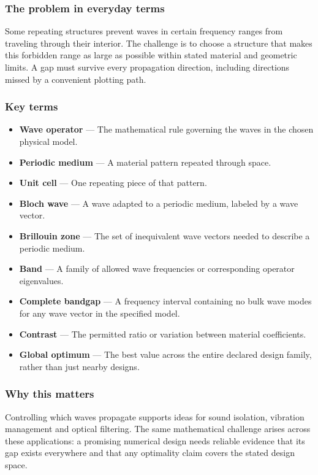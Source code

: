\documentclass[
  11pt,
]{article}
\begin{document}
\subsubsection{The problem in everyday terms}

Some repeating structures prevent waves in certain frequency ranges from
traveling through their interior. The challenge is to choose a structure
that makes this forbidden range as large as possible within stated
material and geometric limits. A gap must survive every propagation
direction, including directions missed by a convenient plotting path.

\subsubsection{Key terms}

\begin{itemize}
\item
  \textbf{Wave operator} --- The mathematical rule governing the waves
  in the chosen physical model.
\item
  \textbf{Periodic medium} --- A material pattern repeated through
  space.
\item
  \textbf{Unit cell} --- One repeating piece of that pattern.
\item
  \textbf{Bloch wave} --- A wave adapted to a periodic medium, labeled
  by a wave vector.
\item
  \textbf{Brillouin zone} --- The set of inequivalent wave vectors
  needed to describe a periodic medium.
\item
  \textbf{Band} --- A family of allowed wave frequencies or
  corresponding operator eigenvalues.
\item
  \textbf{Complete bandgap} --- A frequency interval containing no bulk
  wave modes for any wave vector in the specified model.
\item
  \textbf{Contrast} --- The permitted ratio or variation between
  material coefficients.
\item
  \textbf{Global optimum} --- The best value across the entire declared
  design family, rather than just nearby designs.
\end{itemize}

\subsubsection{Why this matters}

Controlling which waves propagate supports ideas for sound isolation,
vibration management and optical filtering. The same mathematical
challenge arises across these applications: a promising numerical design
needs reliable evidence that its gap exists everywhere and that any
optimality claim covers the stated design space.
\end{document}
